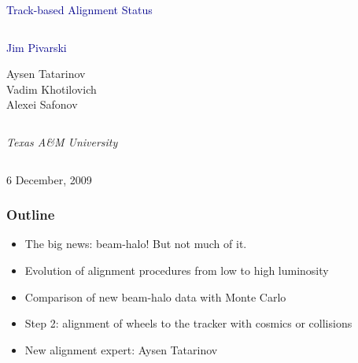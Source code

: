 \documentclass[compress]{beamer}
\begin{document}
\begin{frame}
\vfill
\begin{center}
\textcolor{darkblue}{\Large Track-based Alignment Status}

\vfill
\begin{columns}
\begin{center}
\large
\textcolor{darkblue}{Jim Pivarski}

\normalsize Aysen Tatarinov \\

Vadim Khotilovich \\

Alexei Safonov
\end{center}
\end{columns}

\begin{columns}
\begin{center}
\scriptsize
{\it Texas A\&M University}
\end{center}
\end{columns}

\vfill
 6 December, 2009

\end{center}
\end{frame}


\small

\begin{frame}
\frametitle{Outline}
\begin{itemize}\setlength{\itemsep}{0.5 cm}
\item The big news: beam-halo!  But not much of it.

\item Evolution of alignment procedures from low to high luminosity

\item Comparison of new beam-halo data with Monte Carlo

\item Step 2: alignment of wheels to the tracker with cosmics or collisions

\item New alignment expert: Aysen Tatarinov
\end{itemize}
\end{frame}
\end{document}
